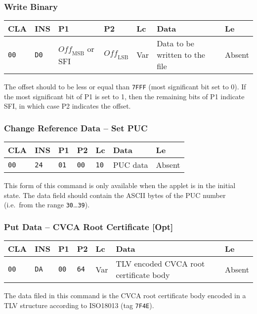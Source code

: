 \documentclass{article}
\begin{document}
\subsubsection{Write Binary}

\begin{flushleft}
\begin{tabular}{|l|l|l|l|l|l|l|}
\hline
CLA & INS & P1 & P2 & Lc & Data & Le \\
\hline
\texttt{00} & \texttt{D0} &
$\mathit{Off}_{\mathrm{MSB}}$ or SFI & $\mathit{Off}_{\mathrm{LSB}}$} &
Var & Data to be written to the file & Absent \\
\hline
\end{tabular}
\end{flushleft}
The offset should
to be less or equal than \texttt{7FFF} (most significant bit set to
0). If the most significant bit of P1 is set to 1, then the remaining bits
of P1 indicate SFI, in which case P2 indicates the offset.




\subsubsection{Change Reference Data -- Set PUC}

\begin{flushleft}
\begin{tabular}{|l|l|l|l|l|l|l|}
\hline
CLA & INS & P1 & P2 & Lc & Data & Le \\
\hline
\texttt{00} & \texttt{24} & \texttt{01} & \texttt{00} &
\texttt{10} & PUC data & Absent \\
\hline
\end{tabular}
\end{flushleft}
This form of this command is only available when the applet is in the 
\textsf{initial} state. The data field should contain the ASCII bytes 
of the PUC number (i.e.\ from the range \texttt{30}\dots\texttt{39}).

\subsubsection{Put Data -- CVCA Root Certificate [Opt]}

\begin{flushleft}
\begin{tabular}{|l|l|l|l|l|l|l|}
\hline
CLA & INS & P1 & P2 & Lc & Data & Le \\
\hline
\texttt{00} & \texttt{DA} & \texttt{00} & \texttt{64} &
Var & TLV encoded CVCA root certificate body & Absent \\
\hline
\end{tabular}
\end{flushleft}
The data filed in this command is the CVCA root certificate body
encoded in a TLV structure according to ISO18013 (tag \texttt{7F4E}).
\end{document}
